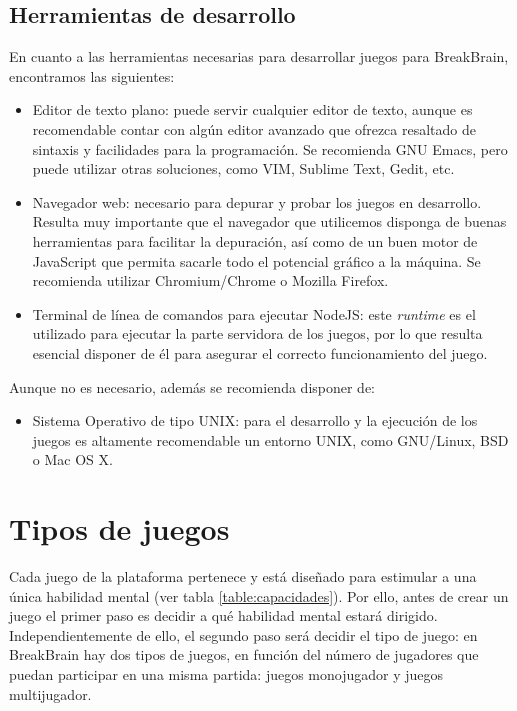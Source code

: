 \subsection{Herramientas de desarrollo}

En cuanto a las herramientas necesarias para desarrollar juegos para BreakBrain, encontramos las siguientes:

\begin{itemize}
\item Editor de texto plano: puede servir cualquier editor de texto, aunque es recomendable contar con algún editor avanzado que ofrezca resaltado de sintaxis y facilidades para la programación. Se recomienda GNU Emacs, pero puede utilizar otras soluciones, como VIM, Sublime Text, Gedit, etc.
\item Navegador web: necesario para depurar y probar los juegos en desarrollo. Resulta muy importante que el navegador que utilicemos disponga de buenas herramientas para facilitar la depuración, así como de un buen motor de JavaScript que permita sacarle todo el potencial gráfico a la máquina. Se recomienda utilizar Chromium/Chrome o Mozilla Firefox.
\item Terminal de línea de comandos para ejecutar NodeJS: este {\it runtime} es el utilizado para ejecutar la parte servidora de los juegos, por lo que resulta esencial disponer de él para asegurar el correcto funcionamiento del juego.
\end{itemize}

Aunque no es necesario, además se recomienda disponer de:

\begin{itemize}
\item Sistema Operativo de tipo UNIX: para el desarrollo y la ejecución de los juegos es altamente recomendable un entorno UNIX, como GNU/Linux, BSD o Mac OS X. 
\end{itemize}

\section{Tipos de juegos}

Cada juego de la plataforma pertenece y está diseñado para estimular a una única habilidad mental (ver tabla \ref{table:capacidades}). Por ello, antes de crear un juego el primer paso es decidir a qué habilidad mental estará dirigido. Independientemente de ello, el segundo paso será decidir el tipo de juego: en BreakBrain hay dos tipos de juegos, en función del número de jugadores que puedan participar en una misma partida: juegos monojugador y juegos multijugador.

